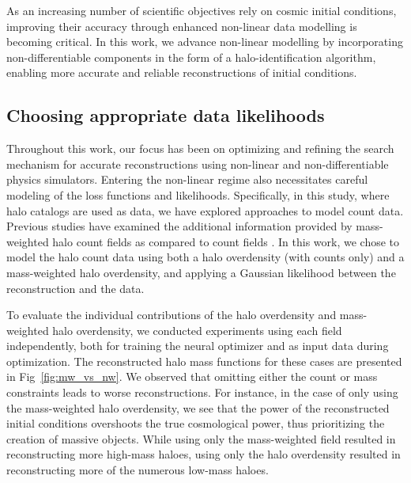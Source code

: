 As an increasing number of scientific objectives rely on cosmic initial conditions, improving their accuracy through enhanced non-linear data modelling is becoming critical. In this work, we advance non-linear modelling by incorporating non-differentiable components in the form of a halo-identification algorithm, enabling more accurate and reliable reconstructions of initial conditions.

\subsection{Choosing appropriate data likelihoods}
\label{sec:discuss_data_likelihood}

Throughout this work, our focus has been on optimizing and refining the search mechanism for accurate reconstructions using non-linear and non-differentiable physics simulators. Entering the non-linear regime also necessitates careful modeling of the loss functions and likelihoods. Specifically, in this study, where halo catalogs are used as data, we have explored approaches to model count data. Previous studies have examined the additional information provided by mass-weighted halo count fields as compared to count fields \citep{Seljak2009,Hamaus2010,Liu2021}. In this work, we chose to model the halo count data using both a halo overdensity (with counts only) and a mass-weighted halo overdensity, and applying a Gaussian likelihood between the reconstruction and the data. 

To evaluate the individual contributions of the halo overdensity and mass-weighted halo overdensity, we conducted experiments using each field independently, both for training the neural optimizer and as input data during optimization. The reconstructed halo mass functions for these cases are presented in Fig~\ref{fig:mw_vs_nw}. We observed that omitting either the count or mass constraints leads to worse reconstructions. For instance, in the case of only using the mass-weighted halo overdensity, we see that the power of the reconstructed initial conditions overshoots the true cosmological power, thus prioritizing the creation of massive objects. While using only the mass-weighted field resulted in reconstructing more high-mass haloes, using only the halo overdensity resulted in reconstructing more of the numerous low-mass haloes. 

